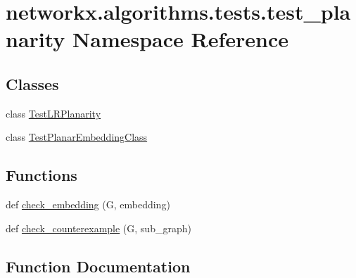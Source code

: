 \hypertarget{namespacenetworkx_1_1algorithms_1_1tests_1_1test__planarity}{}\section{networkx.\+algorithms.\+tests.\+test\+\_\+planarity Namespace Reference}
\label{namespacenetworkx_1_1algorithms_1_1tests_1_1test__planarity}
\subsection*{Classes}
\begin{DoxyCompactItemize}
\item 
class \hyperlink{classnetworkx_1_1algorithms_1_1tests_1_1test__planarity_1_1TestLRPlanarity}{Test\+L\+R\+Planarity}
\item 
class \hyperlink{classnetworkx_1_1algorithms_1_1tests_1_1test__planarity_1_1TestPlanarEmbeddingClass}{Test\+Planar\+Embedding\+Class}
\end{DoxyCompactItemize}
\subsection*{Functions}
\begin{DoxyCompactItemize}
\item 
def \hyperlink{namespacenetworkx_1_1algorithms_1_1tests_1_1test__planarity_a0ac528d113c1bab2f8f92697052d2531}{check\+\_\+embedding} (G, embedding)
\item 
def \hyperlink{namespacenetworkx_1_1algorithms_1_1tests_1_1test__planarity_a3e4274e0c0a9acabb10f49c7fb1bf1b8}{check\+\_\+counterexample} (G, sub\+\_\+graph)
\end{DoxyCompactItemize}


\subsection{Function Documentation}
\mbox{\label{namespacenetworkx_1_1algorithms_1_1tests_1_1test__planarity_a3e4274e0c0a9acabb10f49c7fb1bf1b8}} 
